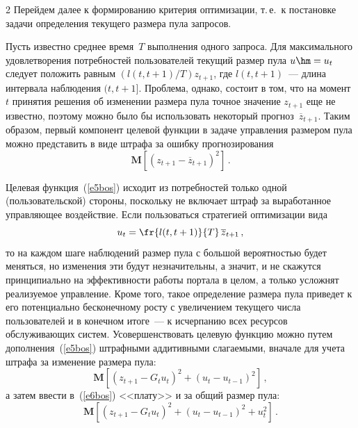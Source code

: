 \begin{multicols}{2}
  Перейдем далее к формированию критерия оптимизации, т.\,е.\ к постановке задачи 
определения текущего размера пула запросов.
  
  Пусть известно среднее время~$T$ выполнения одного запроса. Для максимального 
удовлетворения потребностей пользователей текущий размер пула $u\hm=u_t$ следует 
положить равным $(l(t,t+1)/T) z_{t+1}$, где $l(t,t+1)$~--- длина интервала наблюдения 
$(t,t+1]$. Проблема, однако, состоит в том, что на момент~$t$ принятия решения об 
изменении размера пула точное значение $z_{t+1}$ еще не известно, поэтому можно было 
бы использовать некоторый прогноз~$\overline{z}_{t+1}$. Таким образом, первый 
компонент целевой функции в задаче управления размером пула можно представить в виде 
штрафа за ошибку прогнозирования
  \begin{equation}
  \mathbf{M}\left[ \left( z_{t+1}-\overline{z}_{t+1}\right)^2\right]\,.
  \label{e5bos}
  \end{equation}


  Целевая функция~(\ref{e5bos}) исходит из потребностей только одной 
(пользовательской) стороны, поскольку не включает штраф за выработанное управ\-ля\-ющее 
воздействие. Если пользоваться стратегией оптимизации вида 
\begin{equation}
u_t=\fr{l(t,t+1)}{T}\,\overline{z}_{t+1}\,,
\label{e6-1bos}
\end{equation}
то на каждом шаге наблюдений размер пула с 
большой вероятностью будет меняться, но изменения эти будут незначительны, а значит, и 
не скажутся принципиально на эффективности работы портала в целом, а только усложнят 
реализуемое управление. Кроме того, такое определение размера пула приведет к его 
потенциально бесконечному росту с увеличением текущего числа пользователей и в 
конечном итоге~--- к исчерпанию всех ресурсов обслуживающих систем. 
Усовершенствовать целевую функцию можно путем дополнения~(\ref{e5bos}) штрафными 
аддитивными слагаемыми, вначале для учета штрафа за изменение размера пула:
  \begin{equation}
  \mathbf{M}\left[\left( z_{t+1}-G_t u_t\right)^2+\left( u_t-u_{t-1}\right)^2\right]\,,
  \label{e6bos}
  \end{equation}
а затем ввести в~(\ref{e6bos}) <<плату>> и за общий размер пула:
\begin{equation}
\mathbf{M}\left[\left( z_{t+1}-G_t u_t\right)^2+\left( u_t-u_{t-1}\right)^2+u_t^2\right]\,.
\label{e7bos}
\end{equation}



\end{multicols}
